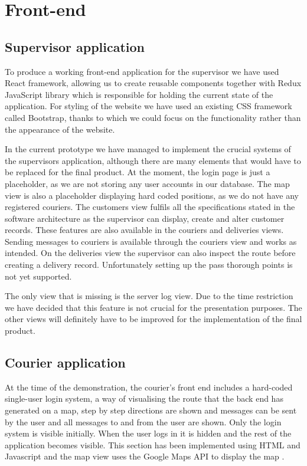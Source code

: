 

\section{Front-end}
\subsection{Supervisor application}
To produce a working front-end application for the supervisor we have used React\cite{React} framework, allowing us to create reusable components together with Redux\cite{Redux} JavaScript library which is responsible for holding the current state of the application. For styling of the website we have used an existing CSS framework called Bootstrap\cite{Bootstrap}, thanks to which we could focus on the functionality rather than the appearance of the website.

In the current prototype we have managed to implement the crucial systems of the supervisors application, although there are many elements that would have to be replaced for the final product. At the moment, the login page is just a placeholder, as we are not storing any user accounts in our database. The map view is also a placeholder displaying hard coded positions, as we do not have any registered couriers. The customers view fulfils all the specifications stated in the software architecture as the supervisor can display, create and alter customer records. These features are also available in the couriers and deliveries views. Sending messages to couriers is available through the couriers view and works as intended. On the deliveries view the supervisor can also inspect the route before creating a delivery record. Unfortunately setting up the pass thorough points is not yet supported.

The only view that is missing is the server log view. Due to the time restriction we have decided that this feature is not crucial for the presentation purposes. The other views will definitely have to be improved for the implementation of the final product.

\subsection{Courier application}
At the time of the demonstration, the courier’s front end includes a hard-coded single-user login system, a way of visualising the route that the back end has generated on a map, step by step directions are shown and messages can be sent by the user and all messages to and from the user are shown. Only the login system is visible initially. When the user logs in it is hidden and the rest of the application becomes visible. This section has been implemented using HTML and Javascript and the map view uses the Google Maps API to display the map \cite{MapsAPI}.

